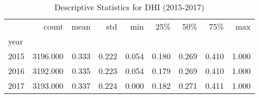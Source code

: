 \begin{table}
\centering
\caption{Descriptive Statistics for DHI (2015-2017)}
\label{tab:bhi}
\begin{tabular}{lrrrrrrrr}
\toprule
{} &    count &  mean &   std &   min &   25\% &   50\% &   75\% &   max \\
year &          &       &       &       &       &       &       &       \\
\midrule
2015 & 3196.000 & 0.333 & 0.222 & 0.054 & 0.180 & 0.269 & 0.410 & 1.000 \\
2016 & 3192.000 & 0.335 & 0.223 & 0.054 & 0.179 & 0.269 & 0.410 & 1.000 \\
2017 & 3193.000 & 0.337 & 0.224 & 0.000 & 0.182 & 0.271 & 0.411 & 1.000 \\
\bottomrule
\end{tabular}
\end{table}
